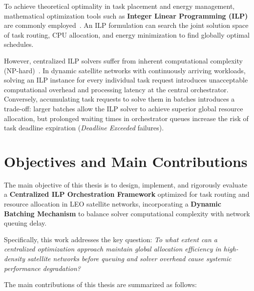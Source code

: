 To achieve theoretical optimality in task placement and energy management, mathematical optimization tools such as \textbf{Integer Linear Programming (ILP)} are commonly employed~\cite{wolsey1998integer, boyd2004convex}. An ILP formulation can search the joint solution space of task routing, CPU allocation, and energy minimization to find globally optimal schedules. 

However, centralized ILP solvers suffer from inherent computational complexity (NP-hard)~\cite{wolsey1998integer}. In dynamic satellite networks with continuously arriving workloads, solving an ILP instance for every individual task request introduces unacceptable computational overhead and processing latency at the central orchestrator. Conversely, accumulating task requests to solve them in batches introduces a trade-off: larger batches allow the ILP solver to achieve superior global resource allocation, but prolonged waiting times in orchestrator queues increase the risk of task deadline expiration (\textit{Deadline Exceeded} failures). 

\section{Objectives and Main Contributions}
\label{sec:intro_objectives}

The main objective of this thesis is to design, implement, and rigorously evaluate a \textbf{Centralized ILP Orchestration Framework} optimized for task routing and resource allocation in LEO satellite networks, incorporating a \textbf{Dynamic Batching Mechanism} to balance solver computational complexity with network queuing delay.

Specifically, this work addresses the key question: \textit{To what extent can a centralized optimization approach maintain global allocation efficiency in high-density satellite networks before queuing and solver overhead cause systemic performance degradation?}

The main contributions of this thesis are summarized as follows:

